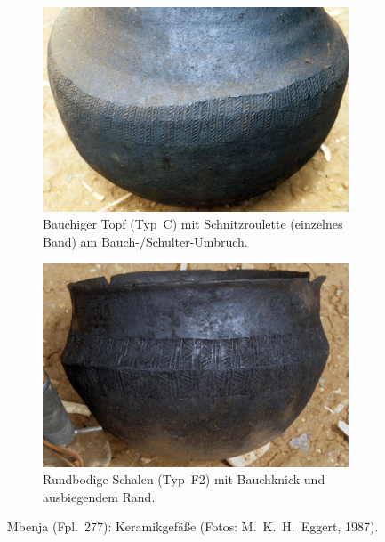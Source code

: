 \begin{figure}[!tb]
	\centering
	\begin{subfigure}[t]{\columnwidth}
		\centering
		\includegraphics[width = \columnwidth]{fig/MBJ87_Roulettekeramik_E87-010-27.jpg}
		\caption{Bauchiger Topf (Typ~C) mit Schnitzroulette (einzelnes Band) am Bauch-/Schulter-Umbruch.}
		\label{fig:MBJ87_Roulettekeramik_E87-010-27}
	\end{subfigure}\hfill
	\begin{subfigure}[t]{\columnwidth}
		\centering
		\includegraphics[width = \columnwidth]{fig/MBJ87_Roulettekeramik_E87-010-25.jpg}
		\caption{Rundbodige Schalen (Typ~F2) mit Bauchknick und ausbiegendem Rand.}
		\label{fig:MBJ87_Roulettekeramik_E87-010-25}
	\end{subfigure}
	\caption{Mbenja (Fpl.~277): Keramikgefäße (Fotos: M.~K.~H.~Eggert, 1987).}
	\label{fig:MBJ87_Roulettekeramik}
\end{figure}

